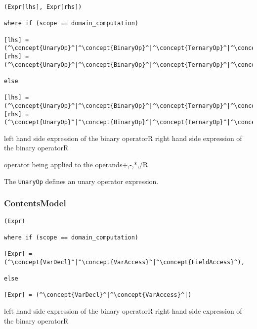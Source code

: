 \begin{lstlisting}[style=default]
(Expr[lhs], Expr[rhs])

where if (scope == domain_computation)

[lhs] = (^\concept{UnaryOp}^|^\concept{BinaryOp}^|^\concept{TernaryOp}^|^\concept{FieldAccess}^|^\concept{VarAccess}^|^\concept{Literal}^)
[rhs] =	(^\concept{UnaryOp}^|^\concept{BinaryOp}^|^\concept{TernaryOp}^|^\concept{FieldAccess}^|^\concept{VarAccess}^|^\concept{Literal}^)

else

[lhs] = (^\concept{UnaryOp}^|^\concept{BinaryOp}^|^\concept{TernaryOp}^|^\concept{VarAccess}^|^\concept{Literal}^)
[rhs] = (^\concept{UnaryOp}^|^\concept{BinaryOp}^|^\concept{TernaryOp}^|^\concept{VarAccess}^|^\concept{Literal}^)
\end{lstlisting}


\begin{HIRChildElements}
	\HIRElementDef{[lhs]}
	{left hand side expression of the binary operator}{R}
	\HIRElementDef{[rhs]}
	{right hand side expression of the binary operator}{R}
\end{HIRChildElements}

\begin{HIRAttributesVal}
	{operator being applied to the operands}{+,-,*,/}{R}
\end{HIRAttributesVal}


The {\tt UnaryOp} defines an unary operator expression.

\subsubsection*{ContentsModel}{}

\begin{lstlisting}[style=default]
(Expr)

where if (scope == domain_computation)

[Expr] = (^\concept{VarDecl}^|^\concept{VarAccess}^|^\concept{FieldAccess}^),

else

[Expr] = (^\concept{VarDecl}^|^\concept{VarAccess}^|)
\end{lstlisting}


\begin{HIRChildElements}
	\HIRElementDef{[lhs]}
	{left hand side expression of the binary operator}{R}
	\HIRElementDef{[rhs]}
	{right hand side expression of the binary operator}{R}
\end{HIRChildElements}

